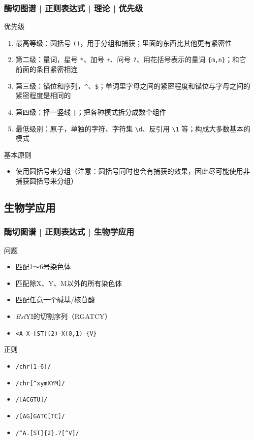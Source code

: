 \begin{frame}[fragile]
  \frametitle{酶切图谱 | 正则表达式 | 理论 | \alert{优先级}}
  \begin{block}{优先级}
  \begin{enumerate}
    \item 最高等级：圆括号 \verb|()|，用于分组和捕获；里面的东西比其他更有紧密性
    \item 第二级：量词，星号 \verb|*|、加号 \verb|+|、问号 \verb|?|、用花括号表示的量词 \verb|{m,n}|；和它前面的条目紧密相连
    \item 第三级：锚位和序列，\verb|^|、\verb|$|；单词里字母之间的紧密程度和锚位与字母之间的紧密程度是相同的
    \item 第四级：择一竖线 \verb=|=；把各种模式拆分成数个组件
    \item 最低级别：原子，单独的字符、字符集 \verb|\d|、反引用 \verb|\1| 等；构成大多数基本的模式
  \end{enumerate}
  \end{block}
  \pause
  \begin{block}{基本原则}
    \begin{itemize}
      \item \alert{使用圆括号来分组}（注意：圆括号同时也会有捕获的效果，因此尽可能使用非捕获圆括号来分组）
    \end{itemize}
  \end{block}
\end{frame}

\subsection{生物学应用}
\begin{frame}[fragile]
  \frametitle{酶切图谱 | 正则表达式 | \alert{生物学应用}}
  \begin{block}{问题}
    \begin{itemize}
      \item<1-> 匹配1～6号染色体
      \item<3-> 匹配除X、Y、M以外的所有染色体
      \item<5-> 匹配任意一个碱基/核苷酸
      \item<7-> \textit{Bst}YI的切割序列（RGATCY）
      \item<9-> \verb|<A-X-[ST](2)-X(0,1)-{V}|
    \end{itemize}
  \end{block}
  \begin{block}{正则}
    \begin{itemize}
      \item<2-> \verb|/chr[1-6]/|
      \item<4-> \verb|/chr[^xymXYM]/|
      \item<6-> \verb|/[ACGTU]/|
      \item<8-> \verb|/[AG]GATC[TC]/|
      \item<10-> \verb|/^A.[ST]{2}.?[^V]/|
    \end{itemize}
  \end{block}
\end{frame}

